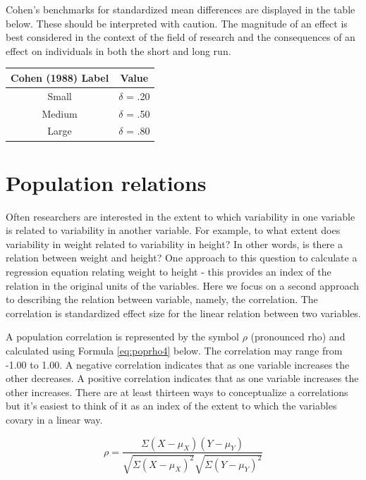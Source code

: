\documentclass[
]{krantz}
\begin{document}
Cohen's benchmarks for standardized mean differences are displayed in the table below. These should be interpreted with caution. The magnitude of an effect is best considered in the context of the field of research and the consequences of an effect on individuals in both the short and long run.

\begin{longtable}[]{@{}cc@{}}
\toprule
Cohen (1988) Label & Value\tabularnewline
\midrule
\endhead
Small & \(\delta\) = .20\tabularnewline
Medium & \(\delta\) = .50\tabularnewline
Large & \(\delta\) = .80\tabularnewline
\bottomrule
\end{longtable}

\hypertarget{population-relations}{%
\section{Population relations}\label{population-relations}}

Often researchers are interested in the extent to which variability in one variable is related to variability in another variable. For example, to what extent does variability in weight related to variability in height? In other words, is there a relation between weight and height? One approach to this question to calculate a regression equation relating weight to height - this provides an index of the relation in the original units of the variables. Here we focus on a second approach to describing the relation between variable, namely, the correlation. The correlation is standardized effect size for the linear relation between two variables.

A population correlation is represented by the symbol \(\rho\) (pronounced rho) and calculated using Formula \eqref{eq:poprho4} below. The correlation may range from -1.00 to 1.00. A negative correlation indicates that as one variable increases the other decreases. A positive correlation indicates that as one variable increases the other increases. There are at least thirteen ways to conceptualize a correlations \citep[see][]{lee1988thirteen} but it's easiest to think of it as an index of the extent to which the variables covary in a linear way.

\begin{equation} 
\rho =  \frac{\Sigma (X - \mu_X)(Y - \mu_Y)}{\sqrt{\Sigma (X - \mu_X)^2}\sqrt{\Sigma (Y - \mu_Y)^2}}
      \label{eq:poprho4}
\end{equation}

\newpage
\end{document}
